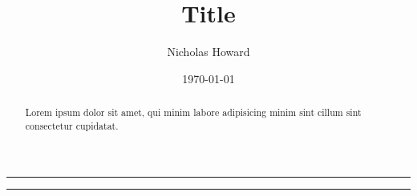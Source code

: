 






\settings
{}

\title{Title}
\author{Nicholas Howard}

\date{\today}
\maketitle

\thispagestyle{titlepage}

\vspace{4mm}
\hrule
\vspace{4mm}

\begin{abstract}
\normalsize
Lorem ipsum dolor sit amet, qui minim labore adipisicing minim sint cillum sint
consectetur cupidatat.
\end{abstract}

\vspace{4mm}
\hrule
\vspace{4mm}

\tableofcontents
\settings
\newpage


\newpage





